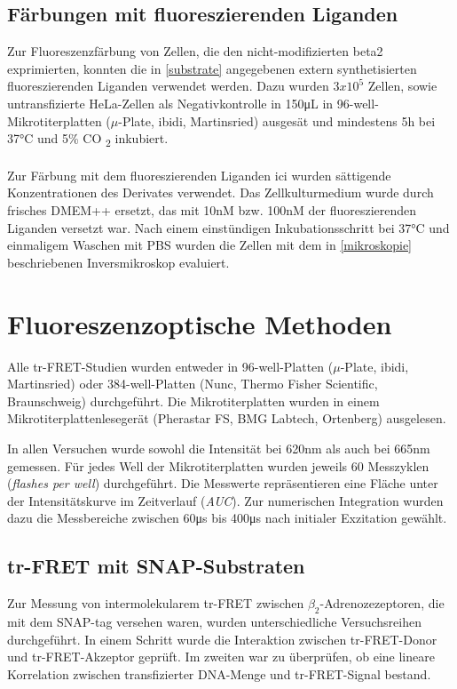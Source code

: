 \subsection{Färbungen mit fluoreszierenden Liganden}
Zur Fluoreszenzfärbung von Zellen, die den nicht-modifizierten \gls{beta2} exprimierten, konnten die in \ref{substrate} angegebenen extern synthetisierten fluoreszierenden Liganden verwendet werden. Dazu wurden $3x10^5$ Zellen, sowie untransfizierte HeLa-Zellen als Negativkontrolle in 150\si{\micro\liter} in 96-well-Mikrotiterplatten ($\mu$-Plate, ibidi, Martinsried) ausgesät und mindestens 5\si{\hour} bei 37\si{\celsius} und 5\% CO \textsubscript{2} inkubiert.
\\ \\
Zur Färbung mit dem fluoreszierenden Liganden \gls{ici} wurden sättigende Konzentrationen des Derivates verwendet. Das Zellkulturmedium wurde durch frisches DMEM++ ersetzt, das mit 10\si{\nano M} bzw. 100\si{\nano M} der fluoreszierenden Liganden versetzt war. Nach einem einstündigen Inkubationsschritt bei 37\si{\celsius} und einmaligem Waschen mit PBS wurden die Zellen mit dem in \ref{mikroskopie} beschriebenen Inversmikroskop evaluiert.

\section{Fluoreszenzoptische Methoden}
\label{reader}
Alle tr-FRET-Studien wurden entweder in 96-well-Platten ($\mu$-Plate, ibidi, Martinsried) oder 384-well-Platten (Nunc, Thermo Fisher Scientific, Braunschweig) durchgeführt. Die Mikrotiterplatten wurden in einem Mikrotiterplattenlesegerät (Pherastar FS, BMG Labtech, Ortenberg) ausgelesen. 

In allen Versuchen wurde sowohl die Intensität bei 620\si{\nano\meter} als auch bei 665\si{\nano\meter} gemessen. Für jedes Well der Mikrotiterplatten wurden jeweils 60 Messzyklen (\textit{flashes per well}) durchgeführt. Die Messwerte repräsentieren eine Fläche unter der Intensitätskurve im Zeitverlauf (\textit{AUC}). Zur numerischen Integration wurden dazu die Messbereiche zwischen 60\si{\micro\second} bis 400\si{\micro\second} nach initialer Exzitation gewählt. 

\subsection{tr-FRET mit SNAP-Substraten}
Zur Messung von intermolekularem tr-FRET zwischen $\beta_2$-Adrenozezeptoren, die mit dem SNAP-tag versehen waren, wurden unterschiedliche Versuchsreihen durchgeführt. In einem Schritt wurde die Interaktion zwischen tr-FRET-Donor und tr-FRET-Akzeptor geprüft. Im zweiten war zu überprüfen, ob eine lineare Korrelation zwischen transfizierter DNA-Menge und tr-FRET-Signal bestand.

